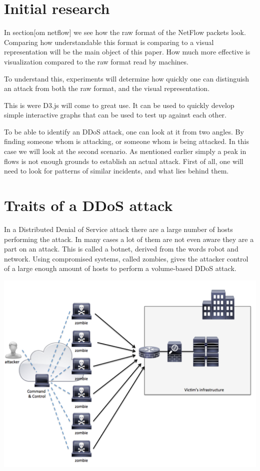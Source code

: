 \section{Initial research}
In section[om netflow] we see how the raw format of the NetFlow packets look. Comparing how understandable this format is comparing to a visual representation will be the main object of this paper. How much more effective is visualization compared to the raw format read by machines. 

To understand this, experiments will determine how quickly one can distinguish an attack from both the raw format, and the visual representation. 

This is were D3.js will come to great use. It can be used to quickly develop simple interactive graphs that can be used to test up against each other.

To be able to identify an DDoS attack, one can look at it from two angles. By finding someone whom is attacking, or someone whom is being attacked. In this case we will look at the second scenario. As mentioned earlier simply a peak in flows is not enough grounds to establish an actual attack. First of all, one will need to look for patterns of similar incidents, and what lies behind them.

\section{Traits of a DDoS attack}
In a Distributed Denial of Service attack there are a large number of hosts performing the attack. In many cases a lot of them are not even aware they are a part on an attack. This is called a botnet, derived from the words robot and network. Using compromised systems, called zombies, gives the attacker control of a large enough amount of hosts to perform a volume-based DDoS attack. 

\includegraphics[scale=0.2]{botnet}

